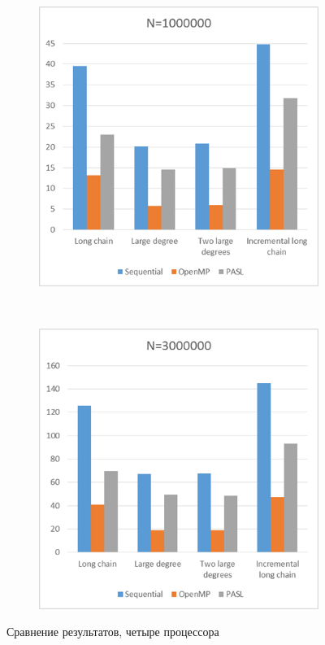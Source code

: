 \documentclass[specification,annotation]{itmo-student-thesis}
\begin{document}
\begin{figure}[!ht]
\begin{subfigure}[b]{0.45\textwidth}
\end{subfigure}\\
\begin{subfigure}[b]{0.45\textwidth}
    \includegraphics[width=\textwidth]{pic/results-4-c.png}
\end{subfigure}~~\begin{subfigure}[b]{0.45\textwidth}
    \includegraphics[width=\textwidth]{pic/results-4-d.png}
\end{subfigure}
\caption{Сравнение результатов, четыре процессора}\label{fig:results-comparison-4}
\end{figure}
\end{document}
